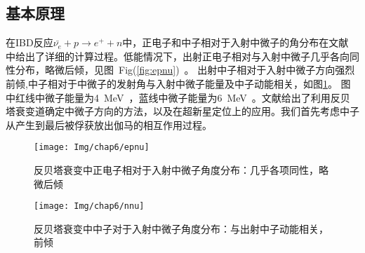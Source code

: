 \subsection{基本原理}
在IBD反应$\bar{\nu_e} + p \rightarrow e^+ + n$中，正电子和中子相对于入射中微子的角分布在文献\citep{vogel1999angular} 中给出了详细的计算过程。低能情况下，出射正电子相对与入射中微子几乎各向同性分布，略微后倾，见图~Fig(\ref{fig:epnu})~。 出射中子相对于入射中微子方向强烈前倾,中子相对于中微子的发射角与入射中微子能量及中子动能相关，如图\ref{fig:nnu}。 图中红线中微子能量为4~MeV~，蓝线中微子能量为6~MeV~。文献\citep{apollonio1999determination}给出了利用反贝塔衰变道确定中微子方向的方法，以及在超新星定位上的应用。我们首先考虑中子从产生到最后被俘获放出伽马的相互作用过程。
\begin{figure}[!htb]
\begin{minipage}[t]{0.48\linewidth}
  \centering
   \texttt{[image: Img/chap6/epnu]}
    \caption{反贝塔衰变中正电子相对于入射中微子角度分布：几乎各项同性，略微后倾}
  \label{fig:epnu}
\end{minipage}
\quad
\begin{minipage}[t]{0.48\linewidth}
  \centering
   \texttt{[image: Img/chap6/nnu]}
    \caption{反贝塔衰变中中子对于入射中微子角度分布：与出射中子动能相关，前倾}
  \label{fig:nnu}
\end{minipage}
\end{figure}


